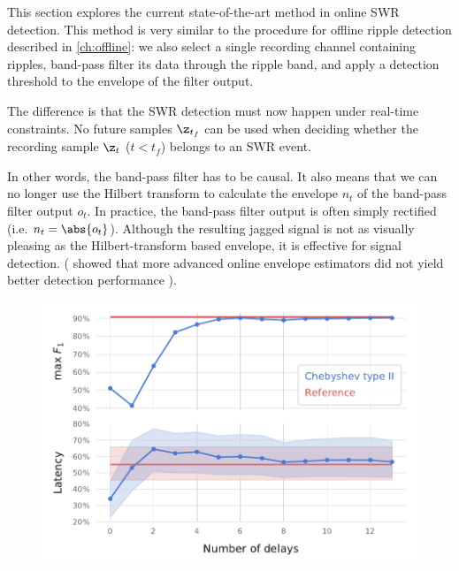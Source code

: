 \label{ch:BPF}

This section explores the current state-of-the-art method in online SWR detection. This method is very similar to the procedure for offline ripple detection described in \cref{ch:offline}: we also select a single recording channel containing ripples, band-pass filter its data through the ripple band, and apply a detection threshold to the envelope of the filter output.

The difference is that the SWR detection must now happen under real-time constraints. No future samples $\z_{t_f}$ can be used when deciding whether the recording sample $\z_t$ ($t < t_f$) belongs to an SWR event.

In other words, the band-pass filter has to be causal. It also means that we can no longer use the Hilbert transform to calculate the envelope $n_t$ of the band-pass filter output $o_t$. In practice, the band-pass filter output is often simply rectified (i.e. $n_t = \abs{o_t}$). Although the resulting jagged signal is not as visually pleasing as the Hilbert-transform based envelope, it is effective for signal detection. ( showed that more advanced online envelope estimators did not yield better detection performance \cite{Sethi2014}).



%   


\clearpage
\begin{figure}
\includegraphics{figures/searcharray-cheby2}
\end{figure}

